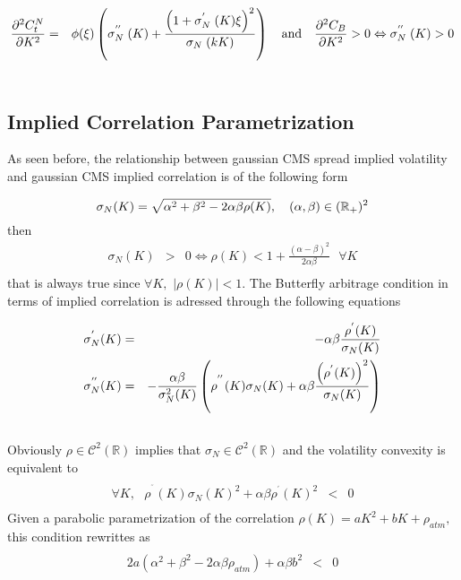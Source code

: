 \documentclass[3pt]{article}
\begin{document}
\begin{eqnarray*}
\frac{\partial ^{2}C_{t}^{N}}{\partial K^{2}} &=&\phi (\xi )\left( \sigma _{N%
\text{ }}^{^{\prime \prime }}(K)+\frac{\left( 1+\sigma _{N\text{ }%
}^{^{\prime }}(K)\xi \right) ^{2}}{\sigma _{N\text{ }}(kK)}\right) \text{ \
\ and \ \ }\frac{\partial ^{2}C_{B}}{\partial K^{2}}>0\Leftrightarrow \sigma
_{N\text{ }}^{^{\prime \prime }}(K)>0 \\
&&
\end{eqnarray*}

\subsection{Implied Correlation Parametrization}

As seen before, the relationship between gaussian CMS spread implied
volatility and gaussian CMS implied correlation is of the following form

\begin{equation*}
\sigma _{N}(K)=\sqrt{\alpha ^{2}+\beta ^{2}-2\alpha \beta \rho (K)},\text{ \
\ (}\alpha ,\beta )\in (\mathbb{R}_{+})^{2}
\end{equation*}%
then%
\begin{eqnarray*}
\sigma _{N}(K) &>&0\Leftrightarrow \rho (K)<1+\frac{\left( \alpha -\beta
\right) ^{2}}{2\alpha \beta }\text{ }\forall K \\
&&
\end{eqnarray*}
that is always true since $\forall K,$ $\left\vert \rho (K)\right\vert <1$.
The Butterfly arbitrage condition in terms of implied correlation is
adressed through the following equations

\begin{eqnarray*}
\sigma _{N}^{^{\prime }}(K) &=&-\alpha \beta \frac{\rho ^{^{\prime }}(K)}{%
\sigma _{N}(K)} \\
\sigma _{N}^{^{\prime \prime }}(K) &=&-\frac{\alpha \beta }{\sigma
_{N}^{2}(K)}\left( \rho ^{^{^{\prime \prime }}}(K)\sigma _{N}(K)+\alpha
\beta \frac{\left( \rho ^{^{\prime }}(K)\right) ^{2}}{\sigma _{N}(K)}\right) 
\\
&&
\end{eqnarray*}%
Obviously $\rho \in \mathcal{C}^{2}(\mathbb{R})$ implies that $\sigma
_{N}\in \mathcal{C}^{2}(\mathbb{R})$ and the volatility convexity is
equivalent to 
\begin{eqnarray*}
&& \\
\forall K,\text{ \ \ }\rho ^{^{^{\prime \prime }}}(K)\sigma
_{N}(K)^{2}+\alpha \beta \rho ^{^{\prime }}(K)^{2} &<&0 \\
&&
\end{eqnarray*}%
Given a parabolic parametrization of the correlation $\rho
(K)=aK^{2}+bK+\rho _{atm},$ this condition rewrittes as%
\begin{eqnarray*}
&& \\
2a\left( \alpha ^{2}+\beta ^{2}-2\alpha \beta \rho _{atm}\right) +\alpha
\beta b^{2} &<&0 \\
&&
\end{eqnarray*}
\end{document}
